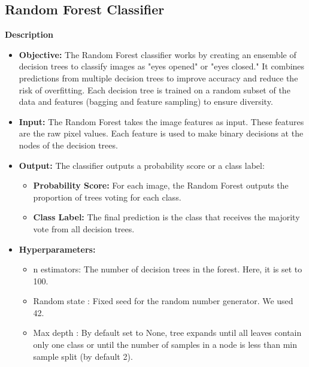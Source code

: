 \documentclass{modeleRapport}
\begin{document}
\newpage

\subsection{Random Forest Classifier}

\bigskip

\textbf{Description\\}

\begin{itemize}
    \item \textbf{Objective:} The Random Forest classifier works by creating an ensemble of decision trees to classify images as "eyes opened" or "eyes closed." 
    It combines predictions from multiple decision trees to improve accuracy and reduce the risk of overfitting.
    Each decision tree is trained on a random subset of the data and features (bagging and feature sampling) to ensure diversity.

    \item \textbf{Input:} The Random Forest takes the image features as input. These features are the raw pixel values. Each feature is used to make binary decisions at the nodes of the decision trees.

    \item \textbf{Output:} The classifier outputs a probability score or a class label:
    \begin{itemize}
        \item \textbf{Probability Score:} For each image, the Random Forest outputs the proportion of trees voting for each class.
        \item \textbf{Class Label:} The final prediction is the class that receives the majority vote from all decision trees.
    \end{itemize}

    \item \textbf{Hyperparameters:}
    \begin{itemize}
        \item n estimators: The number of decision trees in the forest. Here, it is set to 100.
        \item Random state : Fixed seed for the random number generator. We used 42.
        \item Max depth : By default set to None, tree expands until all leaves contain only one class or until the number of samples in a node is less than min sample split (by default 2).
    \end{itemize}
    
   
\end{itemize}
\end{document}
